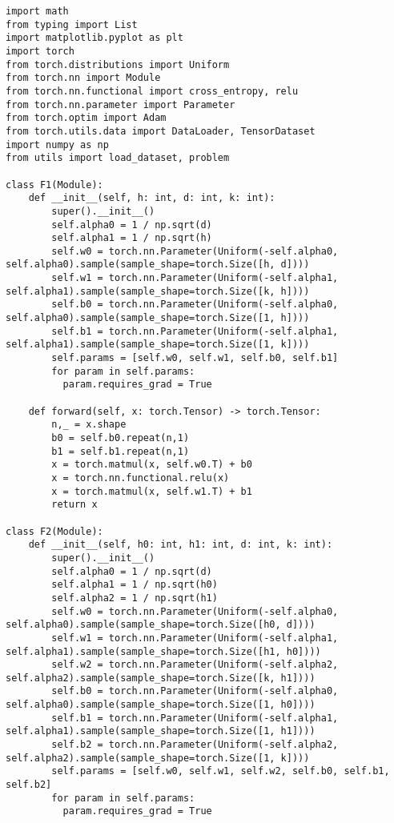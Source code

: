 \documentclass{article}
\begin{document}
        \begin{lstlisting}
import math
from typing import List
import matplotlib.pyplot as plt
import torch
from torch.distributions import Uniform
from torch.nn import Module
from torch.nn.functional import cross_entropy, relu
from torch.nn.parameter import Parameter
from torch.optim import Adam
from torch.utils.data import DataLoader, TensorDataset
import numpy as np
from utils import load_dataset, problem

class F1(Module):
    def __init__(self, h: int, d: int, k: int):
        super().__init__()
        self.alpha0 = 1 / np.sqrt(d)
        self.alpha1 = 1 / np.sqrt(h)
        self.w0 = torch.nn.Parameter(Uniform(-self.alpha0, self.alpha0).sample(sample_shape=torch.Size([h, d])))
        self.w1 = torch.nn.Parameter(Uniform(-self.alpha1, self.alpha1).sample(sample_shape=torch.Size([k, h])))
        self.b0 = torch.nn.Parameter(Uniform(-self.alpha0, self.alpha0).sample(sample_shape=torch.Size([1, h])))
        self.b1 = torch.nn.Parameter(Uniform(-self.alpha1, self.alpha1).sample(sample_shape=torch.Size([1, k])))
        self.params = [self.w0, self.w1, self.b0, self.b1] 
        for param in self.params:
          param.requires_grad = True

    def forward(self, x: torch.Tensor) -> torch.Tensor:
        n,_ = x.shape
        b0 = self.b0.repeat(n,1)
        b1 = self.b1.repeat(n,1)
        x = torch.matmul(x, self.w0.T) + b0
        x = torch.nn.functional.relu(x)
        x = torch.matmul(x, self.w1.T) + b1
        return x
        
class F2(Module):
    def __init__(self, h0: int, h1: int, d: int, k: int):
        super().__init__()
        self.alpha0 = 1 / np.sqrt(d)
        self.alpha1 = 1 / np.sqrt(h0)
        self.alpha2 = 1 / np.sqrt(h1)
        self.w0 = torch.nn.Parameter(Uniform(-self.alpha0, self.alpha0).sample(sample_shape=torch.Size([h0, d])))
        self.w1 = torch.nn.Parameter(Uniform(-self.alpha1, self.alpha1).sample(sample_shape=torch.Size([h1, h0])))
        self.w2 = torch.nn.Parameter(Uniform(-self.alpha2, self.alpha2).sample(sample_shape=torch.Size([k, h1])))
        self.b0 = torch.nn.Parameter(Uniform(-self.alpha0, self.alpha0).sample(sample_shape=torch.Size([1, h0])))
        self.b1 = torch.nn.Parameter(Uniform(-self.alpha1, self.alpha1).sample(sample_shape=torch.Size([1, h1])))
        self.b2 = torch.nn.Parameter(Uniform(-self.alpha2, self.alpha2).sample(sample_shape=torch.Size([1, k])))
        self.params = [self.w0, self.w1, self.w2, self.b0, self.b1, self.b2] 
        for param in self.params:
          param.requires_grad = True


\end{lstlisting}
\end{document}
